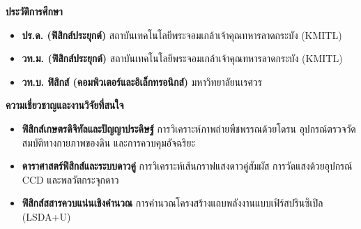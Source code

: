 \noindent
\begin{minipage}[t]{0.48\textwidth}
    {\fontsize{12}{15}\selectfont\bfseries\color{rbruNavy}ประวัติการศึกษา}\par
    \vspace{4pt}
    \begin{itemize}[leftmargin=1.1em, itemsep=2pt]
        \item \textbf{ปร.ด. (ฟิสิกส์ประยุกต์)}\newline
        สถาบันเทคโนโลยีพระจอมเกล้าเจ้าคุณทหารลาดกระบัง (KMITL)
        \item \textbf{วท.ม. (ฟิสิกส์ประยุกต์)}\newline
        สถาบันเทคโนโลยีพระจอมเกล้าเจ้าคุณทหารลาดกระบัง (KMITL)
        \item \textbf{วท.บ. ฟิสิกส์ (คอมพิวเตอร์และอิเล็กทรอนิกส์)}\newline
        มหาวิทยาลัยนเรศวร
    \end{itemize}
\end{minipage}
\hfill
\begin{minipage}[t]{0.48\textwidth}
    {\fontsize{12}{15}\selectfont\bfseries\color{rbruNavy}ความเชี่ยวชาญและงานวิจัยที่สนใจ}\par
    \vspace{4pt}
    \begin{itemize}[leftmargin=1.1em, itemsep=2pt]
        \item \textbf{ฟิสิกส์เกษตรดิจิทัลและปัญญาประดิษฐ์}\newline
        การวิเคราะห์ภาพถ่ายพืชพรรณด้วยโดรน อุปกรณ์ตรวจวัดสมบัติทางกายภาพของดิน และการควบคุมอัจฉริยะ
        \item \textbf{ดาราศาสตร์ฟิสิกส์และระบบดาวคู่}\newline
        การวิเคราะห์เส้นกราฟแสงดาวคู่สัมผัส การวัดแสงด้วยอุปกรณ์ CCD และพลวัตกระจุกดาว
        \item \textbf{ฟิสิกส์สสารควบแน่นเชิงคำนวณ}\newline
        การคำนวณโครงสร้างแถบพลังงานแบบเฟิร์สปรินซิเปิล (LSDA+U)
    \end{itemize}
\end{minipage}

\vspace{16pt}
\vspace{12pt}

